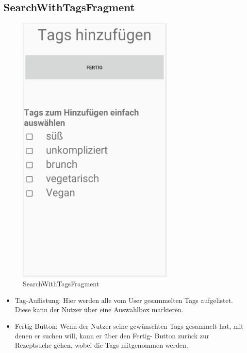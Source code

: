 \subsection{SearchWithTagsFragment}
\begin{figure}[H]
	\centering
	\includegraphics[width=0.7\textwidth]{pics/searchWithTagsFragment.png}%
	\caption{SearchWithTagsFragment}%
	\label{view}%
\end{figure}
\begin{itemize}[nosep]
	\item Tag-Auflistung: Hier werden alle vom User gesammelten Tags aufgelistet. Diese kann der Nutzer über eine Auswahlbox markieren.
	\item Fertig-Button: Wenn der Nutzer seine gewünschten Tags gesammelt hat, mit denen er suchen will, kann er über den Fertig-
	Button zurück zur Rezeptsuche gehen, wobei die Tags mitgenommen werden.

\end{itemize}

